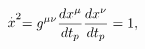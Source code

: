 \begin{equation}
\stackrel{.}{x}^{2}=g^{\mu \nu }\frac{dx^{\mu }}{dt_{p}}\frac{dx^{\nu }}{%
dt_{p}}=1,
\end{equation}

